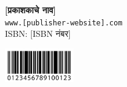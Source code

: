 \documentclass{article}
\begin{document}
\begin{center}
\textbf{[प्रकाशकाचे नाव]}\\
\texttt{www.[publisher-website].com}\\
ISBN: [ISBN नंबर]
\end{center}

\begin{center}
\includegraphics[width=3cm]{isbn_barcode}
\end{center}
\end{document}
